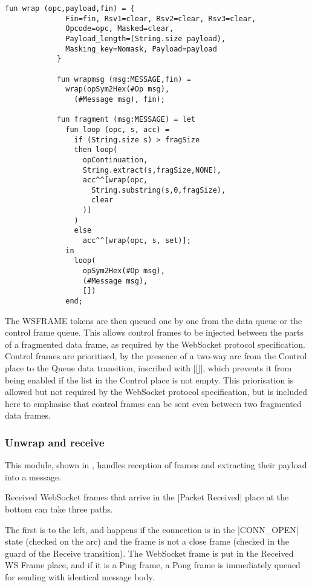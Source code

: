 			
			\begin{lstlisting}[label=lst:fragment,caption=wrap wrapmsg and
			fragment,gobble=3,float]
			fun wrap (opc,payload,fin) = { 
			  Fin=fin, Rsv1=clear, Rsv2=clear, Rsv3=clear,
			  Opcode=opc, Masked=clear,
			  Payload_length=(String.size payload),
			  Masking_key=Nomask, Payload=payload
			}
			
			fun wrapmsg (msg:MESSAGE,fin) = 
			  wrap(opSym2Hex(#Op msg), 
			    (#Message msg), fin);
			    
			fun fragment (msg:MESSAGE) = let
			  fun loop (opc, s, acc) = 
			    if (String.size s) > fragSize
			    then loop(
			      opContinuation,
			      String.extract(s,fragSize,NONE),
			      acc^^[wrap(opc, 
			        String.substring(s,0,fragSize), 
			        clear
			      )]
			    )
			    else 
			      acc^^[wrap(opc, s, set)];
			  in 
			    loop(
			      opSym2Hex(#Op msg), 
			      (#Message msg), 
			      [])
			  end;
			\end{lstlisting}
			
			The WSFRAME tokens are then queued one by one from the data queue or
			the control frame queue. This allows control frames to be injected between
			the parts of a fragmented data frame, as required by the WebSocket protocol
			specification. Control frames are prioritised, by the presence of a
			two-way arc from the Control place to the Queue data transition, inscribed
			with |[]|, which prevents it from being enabled if the list
			in the Control place is not empty. This priorisation is allowed but not
			required by the WebSocket protocol specification, but is included here to
			emphasise that control frames can be sent even between two fragmented data
			frames.
		
	\subsubsection{Unwrap and receive}
		
		
		This module, shown in , handles reception of
		frames and extracting their payload into a message.
		
		Received WebSocket frames that arrive in the |Packet Received| place at the
		bottom can take three paths.
		
		The first is to the left, and happens if the
		connection is in the |CONN_OPEN| state (checked on the arc) and the
		frame is not a close frame (checked in the guard of the Receive transition). The WebSocket
		frame is put in the Received WS Frame place, and if it is a Ping frame, a Pong
		frame is immediately queued for sending with identical message body. 
		
